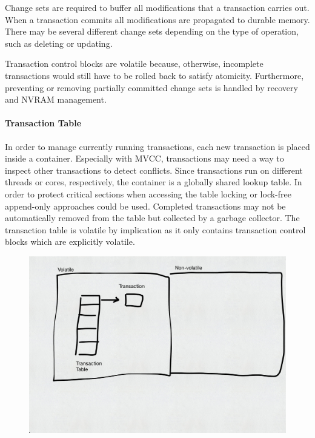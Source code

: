 Change sets are required to buffer all modifications that a transaction carries
out. When a transaction commits all modifications are propagated to durable
memory. There may be several different change sets depending on the type of
operation, such as deleting or updating.

Transaction control blocks are volatile because, otherwise, incomplete
transactions would still have to be rolled back to satisfy atomicity.
Furthermore, preventing or removing partially committed change sets is handled
by recovery and \ac{NVRAM} management.

\paragraph{Transaction Table}

In order to manage currently running transactions, each new transaction is
placed inside a container. Especially with \ac{MVCC}, transactions may need a
way to inspect other transactions to detect conflicts. Since transactions run on
different threads or cores, respectively, the container is a globally shared
lookup table. In order to protect critical sections when accessing the table
locking or lock-free append-only approaches could be used. Completed
transactions may not be automatically removed from the table but collected by a
garbage collector. The transaction table is volatile by implication as it only
contains transaction control blocks which are explicitly volatile.

\begin{figure}[h!]
    \centering
    \includegraphics[width=\textwidth]{figures/drafts/concept-struct-volatile.pdf}
    \caption{}
    \label{fig:concept-struct-volatile}
\end{figure}

